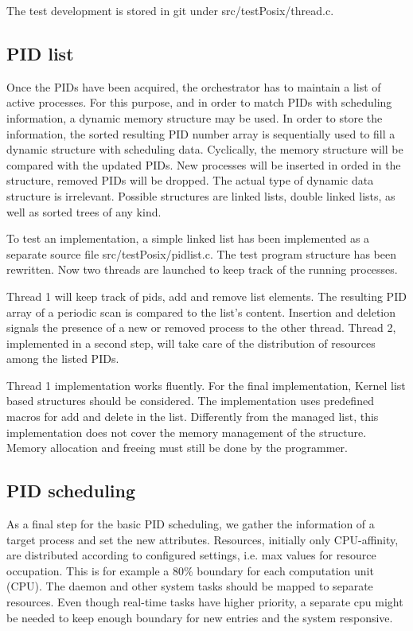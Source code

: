 \documentclass[]{scrartcl}
\begin{document}
The test development is stored in git under {src/testPosix/thread.c}.

\subsection{PID list}

Once the PIDs have been acquired, the orchestrator has to maintain a list of active processes. 
For this purpose, and in order to match PIDs with scheduling information, a dynamic memory structure may be used.
In order to store the information, the sorted resulting PID number array is sequentially used to fill a dynamic structure with scheduling data. 
Cyclically, the memory structure will be compared with the updated PIDs. New processes will be inserted in orded in the structure, removed PIDs will be dropped.
The actual type of dynamic data structure is irrelevant. Possible structures are linked lists, double linked lists, as well as sorted trees of any kind.

To test an implementation, a simple linked list has been implemented as a separate source file {src/testPosix/pidlist.c}.
The test program structure has been rewritten. Now two threads are launched to keep track of the running processes. 

Thread 1 will keep track of pids, add and remove list elements. The resulting PID array of a periodic scan is compared to the list's content.
Insertion and deletion signals the presence of a new or removed process to the other thread.
Thread 2, implemented in a second step, will take care of the distribution of resources among the listed PIDs. 

Thread 1 implementation works fluently. For the final implementation, Kernel list based structures should be considered. 
The implementation uses predefined macros for add and delete in the list. Differently from the managed list, this implementation does not cover the memory management of the structure. Memory allocation and freeing must still be done by the programmer.

\subsection{PID scheduling}
 
As a final step for the basic PID scheduling, we gather the information of a target process and set the new attributes. 
Resources, initially only {CPU}-affinity, are distributed according to configured settings, i.e. max values for resource occupation. 
This is for example a 80\% boundary for each computation unit ({CPU}). 
The daemon and other system tasks should be mapped to separate resources. Even though real-time tasks have higher priority, a separate cpu might be needed to keep enough boundary for new entries and the system responsive.
\end{document}

